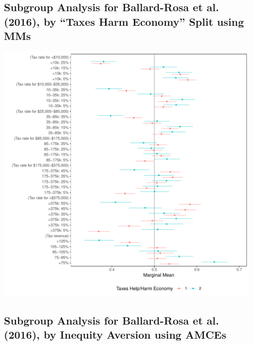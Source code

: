 \documentclass[a4paper,12pt]{article}\usepackage[]{graphicx}\usepackage[]{color}
\makeatletter
\def\maxwidth{ %
  \ifdim\Gin@nat@width>\linewidth
    \linewidth
  \else
    \Gin@nat@width
  \fi
}
\newenvironment{knitrout}{}{} %
\makeatother
\begin{document}
\clearpage

\subsection{Subgroup Analysis for Ballard-Rosa et al. (2016), by ``Taxes Harm Economy'' Split using MMs}

\begin{knitrout}
\color{fgcolor}
\includegraphics[width=\maxwidth]{figure/bms_subgroup_mm_appendix1-1} 

\end{knitrout}

\clearpage

\subsection{Subgroup Analysis for Ballard-Rosa et al. (2016), by Inequity Aversion using AMCEs}
\end{document}
